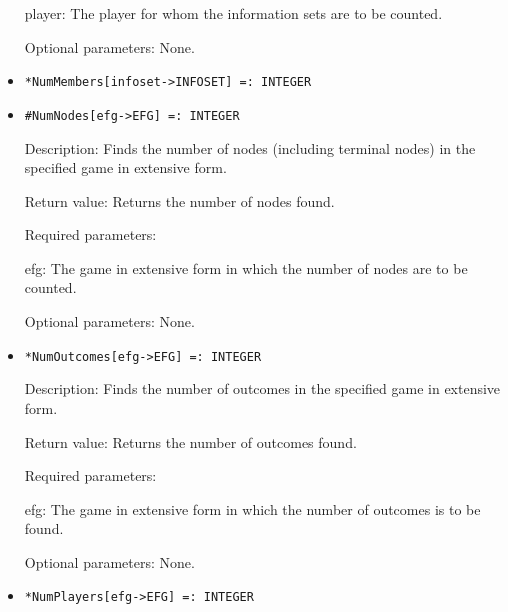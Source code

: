 \begin{itemize}
\bd
\item
[player:] The player for whom the information sets are to be counted.
\item
 [Optional parameters:] None.
\ed
\ed

\item
\protect \large \begin{verbatim}
*NumMembers[infoset->INFOSET] =: INTEGER
\end{verbatim}\normalsize

\item
\protect \large \begin{verbatim}
#NumNodes[efg->EFG] =: INTEGER
\end{verbatim}\normalsize

\bd
\item
[Description:] Finds the number of nodes (including terminal nodes) in
the specified game in extensive form.
\item
[Return value:] Returns the number of nodes found.
\item
[Required parameters:]\hfil\null

\bd
\item
[efg:] The game in extensive form in which the number of nodes are to
be counted.
\ed

\item
[Optional parameters:] None.
\ed

\item
\protect \large \begin{verbatim}
*NumOutcomes[efg->EFG] =: INTEGER
\end{verbatim} \normalsize

\bd
\item
[Description:] Finds the number of outcomes in the specified game
in extensive form.
\item
[Return value:] Returns the number of outcomes found.
\item
[Required parameters:] \hfil\null

\bd
\item
[efg:] The game in extensive form in which the number of outcomes is
to be found.
\ed

\item
[Optional parameters:] None.
\ed

\item
\protect \large \begin{verbatim}
*NumPlayers[efg->EFG] =: INTEGER
\end{verbatim} \normalsize


\end{itemize}
